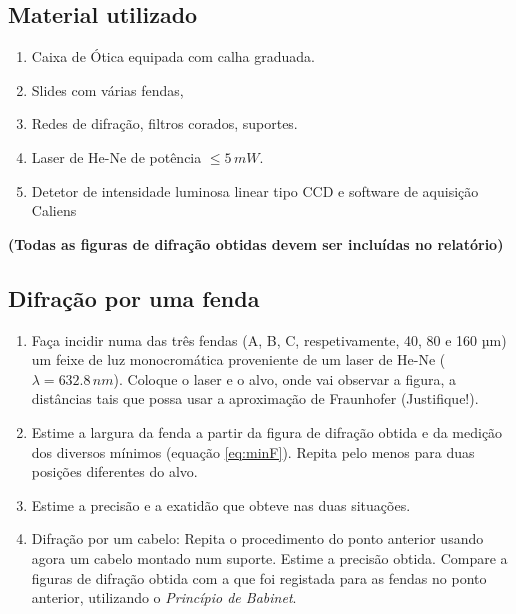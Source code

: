 \documentclass[a4paper,12pt]{article}
\begin{document}
\subsection{\sf Material utilizado}
\begin{enumerate}
\item Caixa de Ótica equipada com calha graduada.
\item Slides com várias fendas, 
\item Redes de difração, filtros corados, suportes. 
\item Laser de He-Ne de potência $\le 5\, mW$.  
\item Detetor de intensidade luminosa linear tipo CCD e software de aquisição Caliens
\end{enumerate}

{\bf (Todas as figuras de difração obtidas devem ser incluídas no relatório)}

\subsection{\sf Difração por uma fenda}

\begin{enumerate}
\item Faça incidir numa das três fendas (A, B, C, respetivamente, 40, 80 e 160 µm) um 
feixe de luz monocromática proveniente de um laser de He-Ne ($\lambda=632.8\,nm$).  
Coloque o laser e o alvo, onde vai observar a figura, a distâncias tais que possa usar 
a aproximação de Fraunhofer (Justifique!). 
\item Estime a largura da fenda a partir da figura de difração obtida e da medição dos diversos mínimos (equação  \ref{eq:minF}).  
Repita pelo menos para duas posições diferentes do 
alvo.  
\item Estime a precisão e a exatidão que obteve nas duas situações. 
\item Difração por um cabelo: Repita  o  procedimento  do  ponto  anterior  usando  agora  um  cabelo  montado  num 
suporte.  
Estime a precisão obtida.  
Compare  a  figuras  de  difração  obtida  com  a  que  foi  registada  para  as  fendas  no 
ponto anterior, utilizando o \emph{Princípio de Babinet}.
\end{enumerate}
\end{document}
